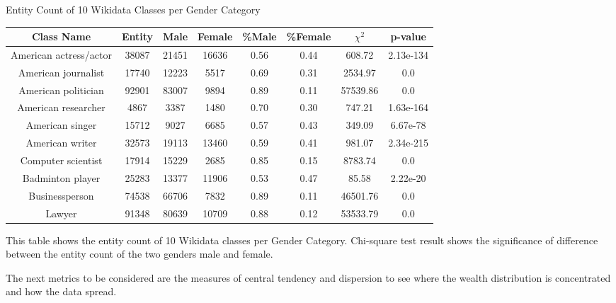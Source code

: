 \begin{center}
\small
\begin{threeparttable}
\caption{Entity Count of 10 Wikidata Classes per Gender Category}
\label{tab:gender - entity count}
\begin{tabular}{c | c c c c c c c} 

\toprule
    Class Name & Entity & Male & Female & \%Male & \%Female & $\chi^2$ & p-value \\ [0.5ex] 

\midrule
    American actress/actor & 38087 & 21451 & 16636 & 0.56 & 0.44 & 608.72 & 2.13e-134 \\
    American journalist & 17740 & 12223 & 5517 & 0.69 & 0.31 & 2534.97 & 0.0 \\
    American politician & 92901 & 83007 & 9894 & 0.89 & 0.11 & 57539.86 & 0.0 \\
    American researcher & 4867 & 3387 & 1480 & 0.70 & 0.30 & 747.21 & 1.63e-164 \\
    American singer & 15712 & 9027 & 6685 & 0.57 & 0.43 & 349.09 & 6.67e-78 \\
    American writer & 32573 & 19113 & 13460 & 0.59 & 0.41 & 981.07 & 2.34e-215 \\
    Computer scientist & 17914 & 15229 & 2685 & 0.85 & 0.15 & 8783.74 & 0.0 \\
    Badminton player & 25283 & 13377 & 11906 & 0.53 & 0.47 & 85.58 & 2.22e-20 \\
    Businessperson & 74538 & 66706 & 7832 & 0.89 & 0.11 & 46501.76 & 0.0 \\
    Lawyer & 91348 & 80639 & 10709 & 0.88 & 0.12 & 53533.79 & 0.0 \\ [1ex]
\bottomrule

\end{tabular}
\begin{tablenotes}
    \footnotesize
    \item{This table shows the entity count of 10 Wikidata classes per Gender Category. Chi-square test result shows the significance of difference between the entity count of the two genders male and female.}
\end{tablenotes}

\end{threeparttable}
\end{center}

The next metrics to be considered are the measures of central tendency and dispersion to see where the wealth distribution is concentrated and how the data spread.

